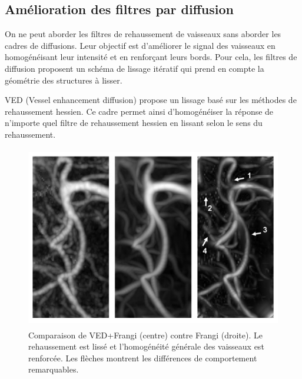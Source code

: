 \subsection{Amélioration des filtres par diffusion}
\label{sec:EA:rehaussement:diffusion}


On ne peut aborder les filtres de rehaussement de vaisseaux sans aborder les cadres de diffusions. Leur objectif est d'améliorer le signal des vaisseaux en homogénéisant leur intensité et en renforçant leurs bords. Pour cela, les filtres de diffusion proposent un schéma de lissage itératif qui prend en compte la géométrie des structures à lisser.


VED \cite{Manniesing2006_VED} (Vessel enhancement diffusion) propose un lissage basé sur les méthodes de rehaussement hessien. Ce cadre permet ainsi d'homogénéiser la réponse de n'importe quel filtre de rehaussement hessien en lissant selon le sens du rehaussement.

\begin{figure}[ht]
  \centering
  \includegraphics[height=8cm]{Images/VED.png}
  \caption{Comparaison de VED+Frangi (centre) contre Frangi (droite). Le rehaussement est lissé et l'homogénéité générale des vaisseaux est renforcée. Les flèches montrent les différences de comportement remarquables.}
  \label{fig:custom_fig}
\end{figure}

